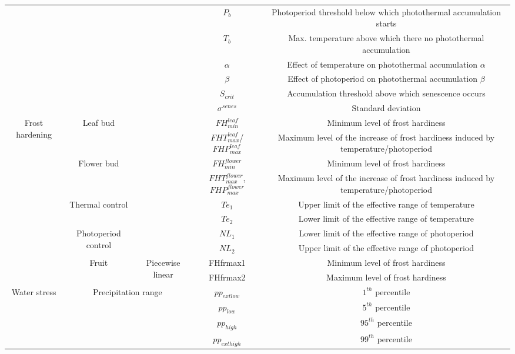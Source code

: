 \begin{table}[!h]
\begin{tabular}{ ccccc }
\cmidrule{1-5}
{\multirow{6}{*}{Leaf senescence}} & & \multirow{6}{7em}{\citet{Delpierre2009}}
& $P_b$ & Photoperiod threshold below which photothermal accumulation starts \\ 
& & & $T_b$ & Max. temperature above which there no photothermal accumulation \\
& & & $\alpha$ & Effect of temperature on photothermal accumulation $\alpha$ \\
& & & $\beta$ & Effect of photoperiod on photothermal accumulation $\beta$ \\ 
& & & $S_{crit}$  & Accumulation threshold above which senescence occurs \\ 
& & & $\sigma^{senes}$  & Standard deviation \\ 

\cmidrule{1-5}
\multirow{10}{5em}{Frost hardening} & \multirow{2}{7em}{Leaf bud} & \multirow{8}{*}{\citet{Leinonen1996}}
& $FH^{leaf}_{min}$ & Minimum level of frost hardiness \\ 
& & & $FHT^{leaf}_{max}$/$FHP^{leaf}_{max}$ & Maximum level of the increase of frost hardiness induced by temperature/photoperiod \\
\cmidrule{4-5}
& \multirow{2}{7em}{Flower bud} &
& $FH^{flower}_{min}$ & Minimum level of frost hardiness \\ 
&  & & $FHT^{flower}_{max}$, $FHP^{flower}_{max}$ & Maximum level of the increase of frost hardiness induced by temperature/photoperiod \\
\cmidrule{4-5}
& \multirow{2}{7em}{Thermal control} &
& $Te_1$ & Upper limit of the effective range of temperature \\ 
& & & $Te_2$  & Lower limit of the effective range of temperature\\ 
\cmidrule{4-5}
& \multirow{2}{7em}{Photoperiod control} &
& $NL_1$ & Lower limit of the effective range of photoperiod \\ 
& & & $NL_2$  & Upper limit of the effective range of photoperiod\\ 
\cmidrule{4-5}
& \multirow{2}{7em}{Fruit} & \multirow{2}{*}{Piecewise linear}
& FHfrmax1 & Minimum level of frost hardiness \\ 
& & & FHfrmax2 & Maximum level of frost hardiness \\

\cmidrule{1-5}
\multirow{4}{5em}{Water stress} & \multicolumn{2}{c}{\multirow{4}{*}{Precipitation range}}
& $pp_{extlow}$ & $1^{th}$ percentile \\
\multicolumn{3}{c}{} & $pp_{low}$ & $5^{th}$ percentile \\
\multicolumn{3}{c}{} & $pp_{high}$ & $95^{th}$ percentile \\
\multicolumn{3}{c}{} & $pp_{exthigh}$ & $99^{th}$ percentile \\ 
\hline

\end{tabular}
\vspace*{-4em}
\end{table}